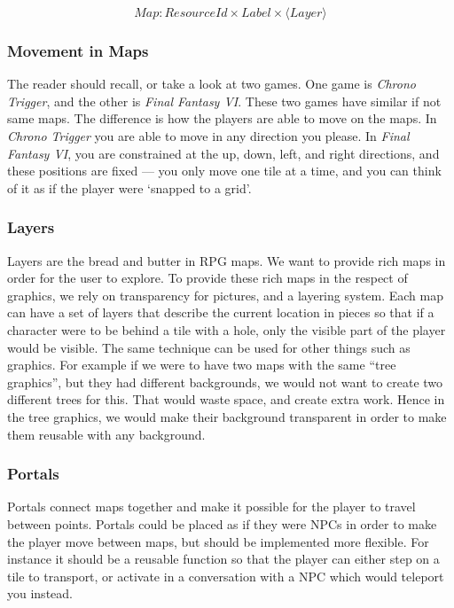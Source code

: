 \begin{equation}
Map\colon ResourceId \times Label \times \langle Layer \rangle
\end{equation}

\subsubsection{Movement in Maps}

The reader should recall, or take a look at two games. One game is 
\textit{Chrono Trigger}, and the other is \textit{Final Fantasy VI}. These two
games have similar if not same maps. The difference is how the players are able
to move on the maps. In \textit{Chrono Trigger} you are able to move in any
direction you please. In \textit{Final Fantasy VI}, you are constrained at the
up, down, left, and right directions, and these positions are fixed --- you only
move one tile at a time, and you can think of it as if the player were `snapped
to a grid'.

\subsubsection{Layers}

Layers are the bread and butter in RPG maps. We want to provide rich maps in
order for the user to explore. To provide these rich maps in the respect of
graphics, we rely on transparency for pictures, and a layering system. Each
map can have a set of layers that describe the current location in pieces so
that if a character were to be behind a tile with a hole, only the visible part
of the player would be visible. The same technique can be used for other things
such as graphics. For example if we were to have two maps with the same ``tree
graphics'', but they had different backgrounds, we would not want to create two
different trees for this. That would waste space, and create extra work. Hence
in the tree graphics, we would make their background transparent in order to
make them reusable with any background.

\subsubsection{Portals}

Portals connect maps together and make it possible for the player to travel
between points. Portals could be placed as if they were NPCs in order to make
the player move between maps, but should be implemented more flexible. For
instance it should be a reusable function so that the player can either step
on a tile to transport, or activate in a conversation with a NPC which would
teleport you instead.

